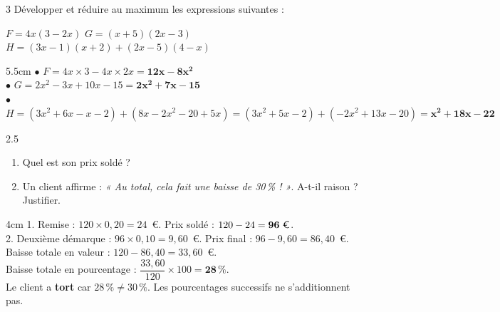 \documentclass[a4paper]{book}
\begin{document}
{    
    \begin{exerciceNote}{3}
        Développer et réduire au maximum les expressions suivantes :
        \medskip
        
        $F = 4x(3 - 2x)$ \quad $G = (x + 5)(2x - 3)$ \quad $H = (3x - 1)(x + 2) + (2x - 5)(4 - x)$
        
        \begin{ZoneReponse}{5.5cm}
        $\bullet$ $F = 4x \times 3 - 4x \times 2x = \mathbf{12x - 8x^2}$ \\
        $\bullet$ $G = 2x^2 - 3x + 10x - 15 = \mathbf{2x^2 + 7x - 15}$ \\
        $\bullet$ $H = (3x^2 + 6x - x - 2) + (8x - 2x^2 - 20 + 5x) = (3x^2 + 5x - 2) + (-2x^2 + 13x - 20) = \mathbf{x^2 + 18x - 22}$
        \end{ZoneReponse}
    \end{exerciceNote}

    
    \begin{exerciceNote}{2.5}
        \begin{enumerate}
            \item Quel est son prix soldé ?
            \item Un client affirme : \textit{« Au total, cela fait une baisse de 30\,\% ! »}. A-t-il raison ? Justifier.
        \end{enumerate}
        \begin{ZoneReponse}{4cm}
        1. Remise : $120 \times 0,20 = 24$~\euro. Prix soldé : $120 - 24 = \mathbf{96\text{ \euro}}$. \\
        2. Deuxième démarque : $96 \times 0,10 = 9,60$~\euro. Prix final : $96 - 9,60 = 86,40$~\euro. \\
        \phantom{2. }Baisse totale en valeur : $120 - 86,40 = 33,60$~\euro. \\
        \phantom{2. }Baisse totale en pourcentage : $\dfrac{33,60}{120} \times 100 = \mathbf{28\,\%}$. \\
        \phantom{2. }Le client a \textbf{tort} car $28\,\% \neq 30\,\%$. Les pourcentages successifs ne s'additionnent pas.
        \end{ZoneReponse}
        \end{exerciceNote}
        
}
\end{document}
